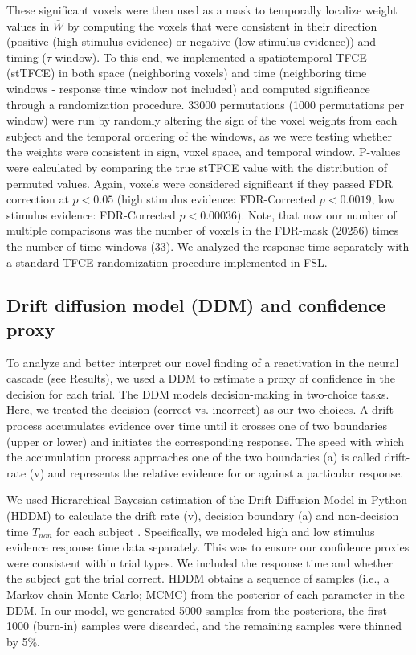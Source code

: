 These significant voxels were then used as a mask to temporally localize weight values in $\bar{W}$  by computing the voxels that were consistent in their direction (positive (high stimulus evidence) or negative (low stimulus evidence)) and timing ($\tau$ window). To this end, we implemented a spatiotemporal TFCE (stTFCE) in both space (neighboring voxels) and time (neighboring time windows - response time window not included) and computed significance through a randomization procedure. 33000 permutations (1000 permutations per window) were run by randomly altering the sign of the voxel weights from each subject and the temporal ordering of the windows, as we were testing whether the weights were consistent in sign, voxel space, and temporal window. P-values were calculated by comparing the true stTFCE value with the distribution of permuted values. Again, voxels were considered significant if they passed FDR correction at $p<0.05$ (high stimulus evidence: FDR-Corrected $p<0.0019$, low stimulus evidence: FDR-Corrected $p<0.00036$). Note, that now our number of multiple comparisons was the number of voxels in the FDR-mask (20256) times the number of time windows (33). We analyzed the response time separately with a standard TFCE randomization procedure implemented in FSL.

\subsection*{Drift diffusion model (DDM) and confidence proxy}
To analyze and better interpret our novel finding of a reactivation in the neural cascade (see Results), we used a DDM to estimate a proxy of confidence in the decision for each trial. The DDM models decision-making in two-choice tasks. Here, we treated the decision (correct vs. incorrect) as our two choices. A drift-process accumulates evidence over time until it crosses one of two boundaries (upper or lower) and initiates the corresponding response\cite{Ratcliff2008}. The speed with which the accumulation process approaches one of the two boundaries (a) is called drift-rate (v) and represents the relative evidence for or against a particular response. 

We used Hierarchical Bayesian estimation of the Drift-Diffusion Model in Python (HDDM) to calculate the drift rate (v), decision boundary (a) and non-decision time $T_{non}$ for each subject \cite{Wiecki2013}. Specifically, we modeled high and low stimulus evidence response time data separately. This was to ensure our confidence proxies were consistent within trial types. We included the response time and whether the subject got the trial correct. HDDM obtains a sequence of samples (i.e., a Markov chain Monte Carlo; MCMC) from the posterior of each parameter in the DDM. In our model, we generated 5000 samples from the posteriors, the first 1000 (burn-in) samples were discarded, and the remaining samples were thinned by 5\%.

